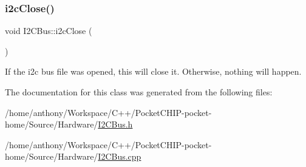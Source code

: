 \subsubsection{\texorpdfstring{i2c\+Close()}{i2cClose()}}
{\footnotesize\ttfamily void I2\+C\+Bus\+::i2c\+Close (\begin{DoxyParamCaption}{ }\end{DoxyParamCaption})}

If the i2c bus file was opened, this will close it. Otherwise, nothing will happen. 

The documentation for this class was generated from the following files\+:\begin{DoxyCompactItemize}
\item 
/home/anthony/\+Workspace/\+C++/\+Pocket\+C\+H\+I\+P-\/pocket-\/home/\+Source/\+Hardware/\mbox{\hyperlink{I2CBus_8h}{I2\+C\+Bus.\+h}}\item 
/home/anthony/\+Workspace/\+C++/\+Pocket\+C\+H\+I\+P-\/pocket-\/home/\+Source/\+Hardware/\mbox{\hyperlink{I2CBus_8cpp}{I2\+C\+Bus.\+cpp}}\end{DoxyCompactItemize}
